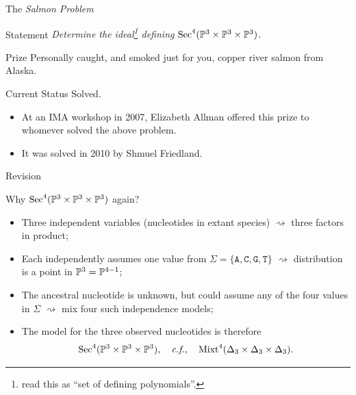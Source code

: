 \begin{frame}{The \emph{Salmon Problem}}

\begin{block}{Statement}
    \emph{Determine the ideal\footnote{read this as ``set of defining polynomials''.} defining $\operatorname{Sec}^{4}(\mathbb{P}^{3} \times \mathbb{P}^{3} \times \mathbb{P}^{3})$.}
\end{block}

\begin{block}{Prize}
    Personally caught, and smoked just for you, copper river salmon from Alaska.
\end{block}

\begin{block}{Current Status}
    Solved.
\end{block}

\begin{itemize}
    \item At an IMA workshop in 2007, Elizabeth Allman offered this prize to whomever solved the above problem.
    \item It was solved in 2010 by Shmuel Friedland.
\end{itemize}

\end{frame}

\begin{frame}{Revision}

Why $\operatorname{Sec}^{4}(\mathbb{P}^{3} \times \mathbb{P}^{3} \times \mathbb{P}^{3})$ again?

\begin{itemize}
    \item Three independent variables (nucleotides in extant species) $\rightsquigarrow$ three factors in product;
    \item Each independently assumes one value from $\Sigma = \{ \texttt{A}, \texttt{C}, \texttt{G}, \texttt{T} \}$ $\rightsquigarrow$ distribution is a point in $\mathbb{P}^{3} = \mathbb{P}^{4-1}$;
    \item The ancestral nucleotide is unknown, but could assume any of the four values in $\Sigma$ $\rightsquigarrow$ mix four such independence models;
    \item The model for the three observed nucleotides is therefore
    \begin{equation*}
            \operatorname{Sec}^{4}(\mathbb{P}^{3} \times \mathbb{P}^{3} \times \mathbb{P}^{3}),\quad \text{\emph{c.f.},} \quad \operatorname{Mixt}^{4}(\Delta_{3} \times \Delta_{3} \times \Delta_{3}).
    \end{equation*}
\end{itemize}
\end{frame}